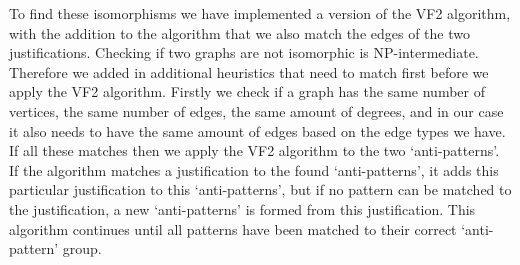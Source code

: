 \documentclass[11pt,letterpaper ,oneside ]{book}
\begin{document}
To find these isomorphisms we have implemented a version of the VF2 algorithm\cite{LCordella:2004}, with the addition to the algorithm that we also match the edges of the two justifications. Checking if two graphs are not isomorphic is NP-intermediate. Therefore we added in additional heuristics that need to match first before we apply the VF2 algorithm. Firstly we check if a graph has the same number of vertices, the same number of edges, the same amount of degrees, and in our case it also needs to have the same amount of edges based on the edge types we have. If all these matches then we apply the VF2 algorithm to the two `anti-patterns'. If the algorithm matches a justification to the found `anti-patterns', it adds this particular justification to this `anti-patterns', but if no pattern can be matched to the justification, a new `anti-patterns' is formed from this justification. This algorithm continues until all patterns have been matched to their correct `anti-pattern' group.\\
\end{document}
